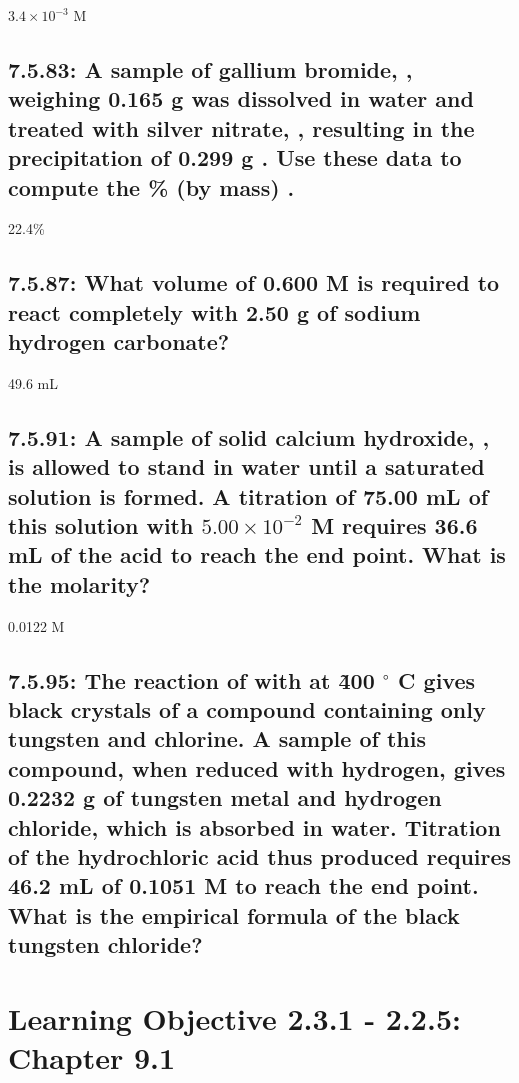 \documentclass[11pt, letterpaper]{article}
\newcommand{\degree}{\ensuremath{{}^{\circ}}\xspace}
\begin{document}
$3.4 \times 10^{-3}$ M 

\subsection*{7.5.83: A sample of gallium bromide, , 
weighing 0.165 g was dissolved in water and treated with silver nitrate, 
, resulting in the precipitation of 0.299 g . 
Use these data to compute the \% (by mass) .}

22.4\%

\subsection*{7.5.87: What volume of 0.600 M  is required to react 
completely with 2.50 g of sodium hydrogen carbonate?
}

49.6 mL

\subsection*{7.5.91: A sample of solid calcium hydroxide, , 
is allowed to stand in water until a saturated solution is formed. 
A titration of 75.00 mL of this solution with $5.00 \times 10^{-2}$
M  requires 36.6 mL of the acid to reach the end point.
What is the molarity?}

0.0122 M

\subsection*{7.5.95: The reaction of  with  at \~400 \degree C 
gives black crystals of a compound containing only tungsten and chlorine. 
A sample of this compound, when reduced with hydrogen, 
gives 0.2232 g of tungsten metal and hydrogen chloride, 
which is absorbed in water. Titration of the hydrochloric acid thus 
produced requires 46.2 mL of 0.1051 M  to reach the end point. 
What is the empirical formula of the black tungsten chloride?}


\section*{Learning Objective 2.3.1 - 2.2.5: Chapter 9.1}
\end{document}
